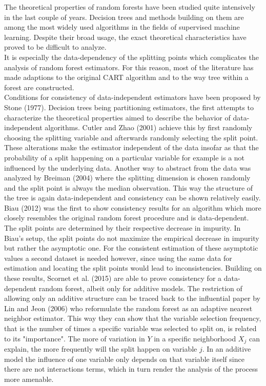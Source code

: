 {The theoretical properties of random forests have been studied quite intensively in the last couple of years. Decision trees and methods building on them are among the most widely used algorithms in the fields of supervised machine learning. Despite their broad usage, the exact theoretical characteristics have proved to be difficult to analyze. \\
It is especially the data-dependency of the splitting points which complicates the analysis of random forest estimators. For this reason, most of the literature has made adaptions to the original CART algorithm and to the way tree within a forest are constructed. \\
Conditions for consistency of data-independent estimators have been proposed by Stone (1977). Decision trees being partitioning estimators, the first attempts to characterize the theoretical properties aimed to describe the behavior of data-independent algorithms. Cutler and Zhao (2001) achieve this by first randomly choosing the splitting variable and afterwards randomly selecting the split point. These alterations make the estimator independent of the data insofar as that the probability of a split happening on a particular variable for example is a not influenced by the underlying data. Another way to abstract from the data was analyzed by Breiman (2004) where the splitting dimension is chosen randomly and the split point is always the median observation. This way the structure of the tree is again data-independent and consistency can be shown relatively easily. \\
Biau (2012) was the first to show consistency results for an algorithm which more closely resembles the original random forest procedure and is data-dependent. The split points are determined by their respective decrease in impurity. In Biau's setup, the split points do not maximize the empirical decrease in impurity but rather the asymptotic one. For the consistent estimation of these asymptotic values a second dataset is needed however, since using the same data for estimation and locating the split points would lead to inconsistencies. Building on these results, Scornet et al. (2015) are able to prove consistency for a data-dependent random forest, albeit only for additive models. The restriction of allowing only an additive structure can be traced back to the influential paper by Lin and Jeon (2006) who reformulate the random forest as an adaptive nearest neighbor estimator. This way they can show that the variable selection frequency, that is the number of times a specific variable was selected to split on, is related to its "importance". The more of variation in $Y$ in a specific neighborhood $X_j$ can explain, the more frequently will the split happen on variable $j$. In an additive model the influence of one variable only depends on that variable itself since there are not interactions terms, which in turn render the analysis of the process more amenable. \\
}
